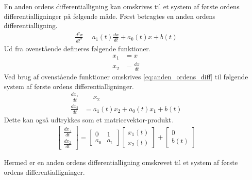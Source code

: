 En anden ordens differentialligning kan omskrives til et system af første ordens differentialligninger på følgende måde. Først betragtes en anden ordens differentialligning. 
\begin{align}\label{eq:anden_ordens_diff}
    \frac{d^2x}{dt^2}= a_1(t)\frac{dx}{dt}+a_0(t)x + b(t)
\end{align}
%
Ud fra ovenstående defineres følgende funktioner.
%
\begin{align*}
    x_1&=x\\
    x_2 &= \frac{dx}{dt}
\end{align*}
%
Ved brug af ovenstående funktioner omskrives \eqref{eq:anden_ordens_diff} til følgende system af første ordens differentialligninger.
%
\begin{align*}
    \frac{dx_1}{dt} &= x_2\\
    \frac{dx_2}{dt} &= a_1(t)x_2 + a_0(t)x_1 + b(t)
\end{align*}
%
Dette kan også udtrykkes som et matricevektor-produkt.
%
\begin{align*}
    \begin{bmatrix}
        \frac{dx_1}{dt}\\
        \frac{dx_2}{dt}
    \end{bmatrix}
    =
    \begin{bmatrix}
    0 & 1\\
    a_0 & a_1
    \end{bmatrix}
    \begin{bmatrix}
        x_1(t)\\
        x_2(t)
    \end{bmatrix}
    + 
    \begin{bmatrix}
        0\\
        b(t)
    \end{bmatrix}
\end{align*}

Hermed er en anden ordens differentialligning omskrevet til et system af første ordens differentialligninger.
